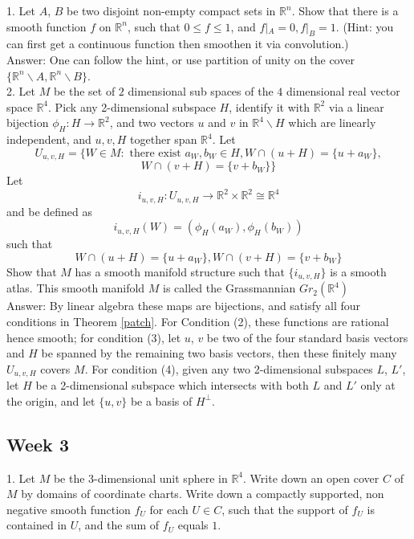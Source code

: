 \documentclass{article}
\theoremstyle{definition}
\begin{document}
1. Let $A$, $B$ be two disjoint non-empty compact sets in $\mathbb{R}^n$. Show that there is a smooth function $f$ on $\mathbb{R}^n$, such that $0\leq f\leq 1$, and $f|_A=0, f|_B=1$. (Hint: you can first get a continuous function then smoothen it via convolution.)\\

Answer: One can follow the hint, or use partition of unity on the cover $\{\mathbb{R}^n\backslash A, \mathbb{R}^n\backslash B\}$.\\

2. Let $M$ be the set of $2$ dimensional sub spaces of the $4$ dimensional real vector space $\mathbb{R}^4$. Pick any 2-dimensional subspace $H$, identify it with $\mathbb{R}^2$ via a linear bijection $\phi_H: H\rightarrow \mathbb{R}^2$, and two vectors $u$ and $v$ in $\mathbb{R}^4\backslash H$ which are linearly independent, and $u, v, H$ together span $\mathbb{R}^4$. Let 
\[U_{u, v, H}=\{W\in M: \text{ there exist }a_W, b_W\in H, W\cap (u+H)=\{u+a_W\},\]
\[W\cap (v+H)=\{v+b_W\}\}\]
Let 
\[i_{u, v, H}: U_{u, v, H}\rightarrow \mathbb{R}^2\times \mathbb{R}^2\cong\mathbb{R}^4\]
and be defined as 
\[i_{u, v, H}(W)=(\phi_H(a_W), \phi_H(b_W))\]
such that
\[W\cap (u+H)=\{u+a_W\}, W\cap (v+H)=\{v+b_W\}\]
Show that $M$ has a smooth manifold structure such that $\{i_{u, v, H}\}$ is a smooth atlas. This smooth manifold $M$ is called the Grassmannian $Gr_2(\mathbb{R}^4)$\\

Answer: By linear algebra these maps are bijections, and satisfy all four conditions in Theorem \ref{patch}. For Condition (2), these functions are rational hence smooth; for condition (3), let $u$, $v$ be two of the four standard basis vectors and $H$ be spanned by the remaining two basis vectors, then these finitely many $U_{u, v, H}$ covers $M$. For condition (4), given any two 2-dimensional subspaces $L$, $L'$, let $H$ be a 2-dimensional subspace which intersects with both $L$ and $L'$ only at the origin, and let $\{u, v\}$ be a basis of $H^\perp$.

\subsection{Week 3}

1. Let $M$ be the 3-dimensional unit sphere in $\mathbb{R}^4$. Write down an open cover $C$ of $M$ by domains of coordinate charts. Write down a compactly supported, non negative smooth function $f_U$ for each $U\in C$, such that the support of $f_U$ is contained in $U$, and the sum of $f_U$ equals $1$.\\
\end{document}
